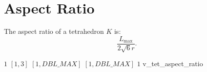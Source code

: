 \section{Aspect Ratio\label{s:tet-aspect-ratio}}

The aspect ratio of a tetrahedron $K$ is: 
\[
\frac{L_{\max}}{2\sqrt{6}r}.
\]

%
{$1$}%
{$[1,3]$}%
{$[1,DBL\_MAX]$}%
{$[1,DBL\_MAX]$}%
{$1$}%
{\cite{frey:00}}%
{v\_tet\_aspect\_ratio}%
